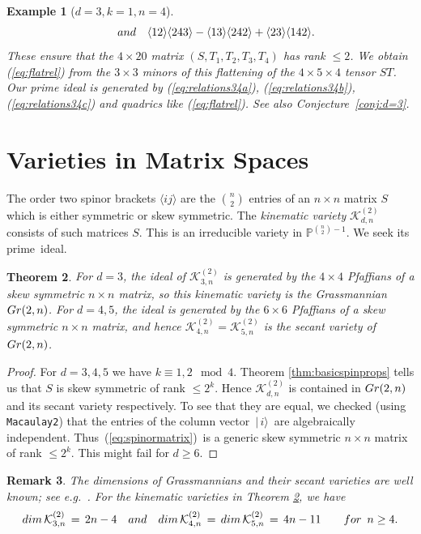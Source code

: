 \documentclass[english]{ourlematema}
\newtheorem{theorem}{Theorem}
\numberwithin{theorem}{section}
\newtheorem{remark}[theorem]{Remark}
\newtheorem{example}[theorem]{Example}
\theoremstyle{definition}
\newcommand{\PP}{\mathbb{P}}
\begin{document}
\begin{example}[$d=3,k=1,n=4$]
\begin{equation}
\quad {\rm and} \quad
  \langle 12 \rangle  \langle 243 \rangle
 - \langle 13 \rangle \langle 242 \rangle 
 + \langle 23 \rangle \langle 142 \rangle. 
 \end{equation}
These ensure that the 
$4 \times 20$ matrix $(S,T_1,T_2,T_3,T_4)$ has rank $\leq 2$.
We obtain (\ref{eq:flatrel}) from the
$3 \times 3$ minors of this flattening
of the $4 \times 5 \times 4$ tensor $ST$.
Our prime ideal is generated 
by (\ref{eq:relations34a}),
 (\ref{eq:relations34b}),
 (\ref{eq:relations34c}) and quadrics like (\ref{eq:flatrel}).
 See also Conjecture~\ref{conj:d=3}.
 \end{example}

\section{Varieties in Matrix Spaces}
\label{sec5}

The order two spinor brackets $\langle i j \rangle$ are the $\binom{n}{2}$  entries
of an $n \times n$ matrix $S$ which is either symmetric or skew symmetric.
The {\em kinematic variety} $\mathcal{K}^{(2)}_{d,n}$
consists of such matrices $S$.
This is an irreducible variety in  $\PP^{\binom{n}{2}-1}$.
We seek its prime~ideal.

\begin{theorem}
\label{thm:ordertwosmall}
For $d=3$, the ideal of $\mathcal{K}^{(2)}_{3,n}$ 
is generated by the $4 \times 4$ Pfaffians of
a skew symmetric $n \times n$ matrix, so this kinematic
variety is the Grassmannian ${\rm Gr}(2,n)$.
For $d=4,5$, the ideal is generated by the $6 \times 6$ Pfaffians
of a skew symmetric $n \times n$ matrix, and hence
   $\mathcal{K}^{(2)}_{4,n}=\mathcal{K}^{(2)}_{5,n}$   is the secant variety of ${\rm Gr}(2,n)$.
\end{theorem}

\begin{proof}
For $d = 3,4,5$ we have $k \equiv1,2 \!\! \mod{4}$.
 Theorem \ref{thm:basicspinprops} tells us that
$S$ is skew symmetric of rank $\leq 2^k$.
Hence $\mathcal{K}^{(2)}_{d,n}$ is contained in
${\rm Gr}(2,n)$ and its secant variety respectively.
To see that they are equal, we checked (using {\tt Macaulay2}) that 
the entries of the column vector $\,|\, i \rangle\,$ are algebraically independent.
Thus~(\ref{eq:spinormatrix})~is a generic
skew symmetric $n \times n$ matrix of rank $\leq 2^k$.
This might fail for $d \geq 6$.
\end{proof}

\begin{remark}
The dimensions of Grassmannians and their secant varieties
are well known; see e.g.~\cite{CGG}. For the kinematic varieties
in Theorem \ref{thm:ordertwosmall}, we have
\begin{equation}\label{eq:grassdim} {\rm dim}\, \mathcal{K}^{(2)}_{3,n} \,=\, 2n-4
\quad {\rm and} \quad 
{\rm dim} \, \mathcal{K}^{(2)}_{4,n} \,=\,{\rm dim} \, \mathcal{K}^{(2)}_{5,n} \,=\,
 4n-11 \qquad {\rm for} \,\,\, n \geq 4.
\end{equation}
 \end{remark}
\end{document}
